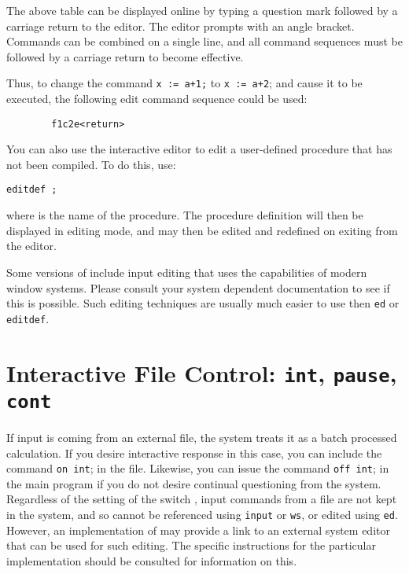 The above table can be displayed online by typing a question mark followed
by a carriage return to the editor. The editor prompts with an angle
bracket. Commands can be combined on a single line, and all command
sequences must be followed by a carriage return to become effective.

Thus, to change the command \texttt{x := a+1;} to \texttt{x := a+2}; and cause
it to be executed, the following edit command sequence could be used:
\begin{verbatim}
        f1c2e<return>
\end{verbatim}
\hypertarget{command:EDITDEF}{}
You can also use the interactive editor to edit a user-defined
procedure that has not been compiled.  To do this, use:
\begin{syntax}
  \texttt{editdef }\texttt{;}
\end{syntax}
where  is the name of the procedure.  The procedure definition
will then be displayed in editing mode, and may then be edited and
redefined on exiting from the editor.

Some versions of {\REDUCE} include input editing that uses the
capabilities of modern window systems.  Please consult your system
dependent documentation to see if this is possible.  Such editing
techniques are usually much easier to use then \texttt{ed} or
\texttt{editdef}.

\section{Interactive File Control:
  \texttt{\small int}, \texttt{\small pause}, \texttt{\small cont}}

\hypertarget{switch:INT}{}
If input is coming from an external file, the system treats it as a
batch processed calculation.  If you desire
interactive response in this case, you can
include the command \texttt{on int}; in the file.
Likewise, you can issue the command \texttt{off int}; in the main
program if you do not desire continual questioning from the system.
Regardless of the setting of the switch , input commands from
a file are not kept in the system, and so cannot be referenced using
\texttt{input} or \texttt{ws}, or edited using \texttt{ed}.  However,
an implementation of {\REDUCE} may provide a link to an external
system editor that can be used for such editing.  The specific
instructions for the particular implementation should be consulted for
information on this.

